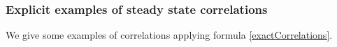 \documentclass[10pt]{article}
\numberwithin{equation}{section}
\numberwithin{equation}{subsection}
\begin{document}

\subsubsection{Explicit examples of steady state correlations}
We give some examples of correlations applying formula \eqref{exactCorrelations}.
\end{document}
